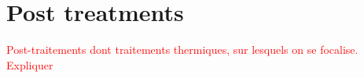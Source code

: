 \section{Post treatments}
\textcolor{red}{Post-traitements dont traitements thermiques, sur lesquels on se focalise. Expliquer}\\
%
%
